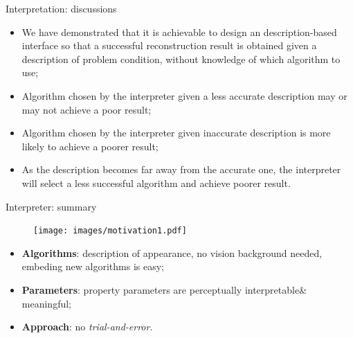 \documentclass[10pt]{beamer}
\begin{document}
\begin{frame}{Interpretation: discussions}

\begin{exampleblock}{}
\begin{itemize}
\item We have demonstrated that it is achievable to design an description-based interface so that a successful reconstruction result is obtained given a description of problem condition, without knowledge of which algorithm to use;
\item Algorithm chosen by the interpreter given a less accurate description may or may not achieve a poor result;
\item Algorithm chosen by the interpreter given inaccurate description is more likely to achieve a poorer result;
\item As the description becomes far away from the accurate one, the interpreter will select a less successful algorithm and achieve poorer result.
\end{itemize}
\end{exampleblock}

\end{frame}

\begin{frame}{Interpreter: summary}

\begin{figure}
\centering
\texttt{[image: images/motivation1.pdf]}
\end{figure}

\begin{exampleblock}{}
  \begin{itemize}
    \item \textbf{Algorithms}: description of appearance, no vision background needed, embeding new algorithms is easy;
    \item \textbf{Parameters}: property parameters are perceptually interpretable\& meaningful;
    \item \textbf{Approach}: no \textit{trial-and-error}.
  \end{itemize}
\end{exampleblock}

\end{frame}
\end{document}
